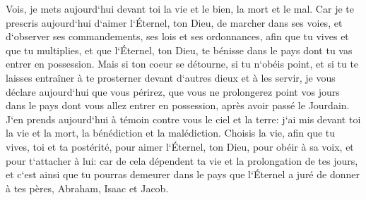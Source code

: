\verse Vois, je mets aujourd`hui devant toi la vie et le bien, la mort et le mal. 
\verse Car je te prescris aujourd`hui d`aimer l`Éternel, ton Dieu, de marcher dans ses voies, et d`observer ses commandements, ses lois et ses ordonnances, afin que tu vives et que tu multiplies, et que l`Éternel, ton Dieu, te bénisse dans le pays dont tu vas entrer en possession. 
\verse Mais si ton coeur se détourne, si tu n`obéis point, et si tu te laisses entraîner à te prosterner devant d`autres dieux et à les servir, 
\verse je vous déclare aujourd`hui que vous périrez, que vous ne prolongerez point vos jours dans le pays dont vous allez entrer en possession, après avoir passé le Jourdain. 
\verse J`en prends aujourd`hui à témoin contre vous le ciel et la terre: j`ai mis devant toi la vie et la mort, la bénédiction et la malédiction. Choisis la vie, afin que tu vives, toi et ta postérité, 
\verse pour aimer l`Éternel, ton Dieu, pour obéir à sa voix, et pour t`attacher à lui: car de cela dépendent ta vie et la prolongation de tes jours, et c`est ainsi que tu pourras demeurer dans le pays que l`Éternel a juré de donner à tes pères, Abraham, Isaac et Jacob. 

